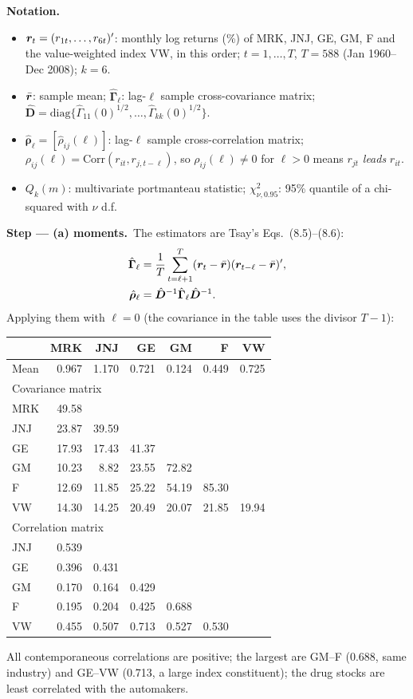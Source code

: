 \documentclass[11pt,a4paper]{article}
\newenvironment{notacao}{\par\smallskip\noindent\textbf{Notation.}\begin{itemize}[leftmargin=1.4em,topsep=1pt,itemsep=0pt]\small}{\end{itemize}}
\newcommand{\passo}[2]{\par\smallskip\noindent\textbf{Step --- #1.}~#2}
\newcommand{\bGamma}{\bm{\Gamma}}\newcommand{\bPhi}{\bm{\Phi}}\newcommand{\bI}{\bm{I}}
\begin{document}
\begin{sol}
\begin{notacao}
\item $\bm{r}_t=(r_{1t},\dots,r_{6t})'$: monthly log returns (\%) of MRK, JNJ, GE, GM, F and the
value-weighted index VW, in this order; $t=1,\dots,T$, $T=588$ (Jan 1960--Dec 2008); $k=6$.
\item $\bar{\bm{r}}$: sample mean; $\hat{\bGamma}_\ell$: lag-$\ell$ sample cross-covariance matrix;
$\hat{\bm D}=\mathrm{diag}\{\hat\Gamma_{11}(0)^{1/2},\dots,\hat\Gamma_{kk}(0)^{1/2}\}$.
\item $\hat{\bm\rho}_\ell=[\hat\rho_{ij}(\ell)]$: lag-$\ell$ sample cross-correlation matrix;
$\rho_{ij}(\ell)=\mathrm{Corr}(r_{it},r_{j,t-\ell})$, so $\rho_{ij}(\ell)\neq0$ for $\ell>0$ means
$r_{jt}$ \emph{leads} $r_{it}$.
\item $Q_k(m)$: multivariate portmanteau statistic; $\chi^2_{\nu,0.95}$: 95\% quantile of a chi-squared with $\nu$ d.f.
\end{notacao}

\passo{(a) moments}{The estimators are Tsay's Eqs.~(8.5)--(8.6):
\begin{align}
\hat{\bGamma}_\ell&=\frac1T\sum_{t=\ell+1}^{T}(\br_t-\bar{\br})(\br_{t-\ell}-\bar{\br})',\label{eq:q1gam}\\
\hat{\bm\rho}_\ell&=\hat{\bm D}^{-1}\hat{\bGamma}_\ell\hat{\bm D}^{-1}.\label{eq:q1rho}
\end{align}
Applying them with $\ell=0$ (the covariance in the table uses the divisor $T-1$):}
\begin{center}\small
\begin{tabular}{lrrrrrr}
\toprule
 & MRK & JNJ & GE & GM & F & VW\\
\midrule
Mean & 0.967 & 1.170 & 0.721 & 0.124 & 0.449 & 0.725\\
\midrule
\multicolumn{7}{l}{Covariance matrix}\\
MRK & 49.58 & & & & & \\
JNJ & 23.87 & 39.59 & & & & \\
GE & 17.93 & 17.43 & 41.37 & & & \\
GM & 10.23 & 8.82 & 23.55 & 72.82 & & \\
F & 12.69 & 11.85 & 25.22 & 54.19 & 85.30 & \\
VW & 14.30 & 14.25 & 20.49 & 20.07 & 21.85 & 19.94\\
\midrule
\multicolumn{7}{l}{Correlation matrix}\\
JNJ & 0.539 & & & & & \\
GE & 0.396 & 0.431 & & & & \\
GM & 0.170 & 0.164 & 0.429 & & & \\
F & 0.195 & 0.204 & 0.425 & 0.688 & & \\
VW & 0.455 & 0.507 & 0.713 & 0.527 & 0.530 & \\
\bottomrule
\end{tabular}
\end{center}
All contemporaneous correlations are positive; the largest are GM--F (0.688, same industry) and
GE--VW (0.713, a large index constituent); the drug stocks are least correlated with the automakers.


\end{sol}
\end{document}
